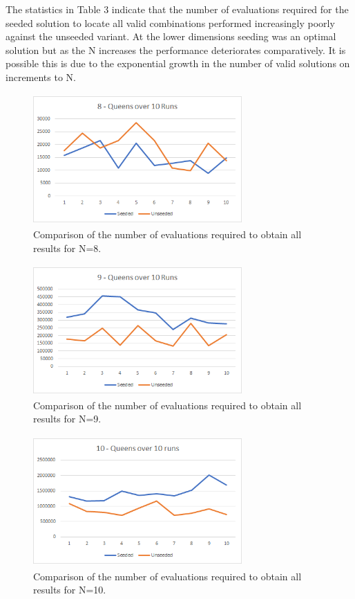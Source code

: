 \documentclass[conference]{IEEEtran}
\begin{document}
The statistics in Table 3 indicate that the number of evaluations required for the seeded solution to locate all valid combinations performed increasingly poorly against the unseeded variant. At the lower dimensions seeding was an optimal solution but as the N increases the performance deteriorates comparatively. It is possible this is due to the exponential growth in the number of valid solutions on increments to N. 

\begin{figure}[!htbp]
	\centering	
	\includegraphics[width=8cm, height=5cm]{8QueensAllValues}
	\caption{Comparison of the number of evaluations required to obtain all results for N=8.}
\end{figure}

\begin{figure}[!htbp]
	\centering	
	\includegraphics[width=8cm, height=5cm]{9QueensAllValues}
		\caption{Comparison of the number of evaluations required to obtain all results for N=9.}
\end{figure}

\begin{figure}[!htbp]
	\centering	
	\includegraphics[width=8cm, height=5cm]{10QueensAllValues}
		\caption{Comparison of the number of evaluations required to obtain all results for N=10.}
\end{figure}
\end{document}
